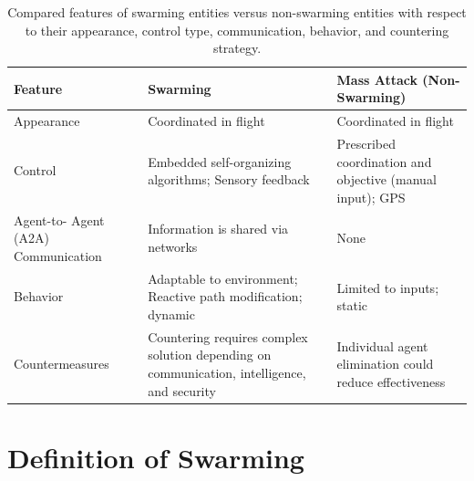 \begin{table}[]
\caption{Compared features of swarming entities versus non-swarming entities with respect to their appearance, control type, communication, behavior, and countering strategy.}
\label{tab:my-table}
\begin{tabular}{lll}
\hline
\textbf{Feature} & \textbf{Swarming} & \textbf{Mass Attack (Non- Swarming)} \\ \hline
Appearance & Coordinated in flight & Coordinated in flight \\ \hline
Control & Embedded self-organizing algorithms; Sensory feedback & Prescribed coordination and objective (manual input); GPS \\ \hline
Agent-to- Agent (A2A) Communication & Information is shared via networks & None \\ \hline
Behavior & Adaptable to environment; Reactive path modification;   dynamic & Limited to inputs; static \\ \hline
Countermeasures & Countering requires complex solution depending on   communication, intelligence, and security & Individual agent elimination could reduce effectiveness \\ \hline
\end{tabular}
\end{table}


\section*{Definition of Swarming}

